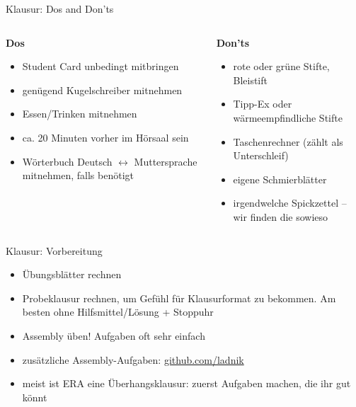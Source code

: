 \documentclass[
  german,            %
  aspectratio=169,    %
]{tumbeamer}
\newcommand{\cmark}{\ding{51}}%
\newcommand{\xmark}{\ding{55}}%
\begin{document}
\begin{frame}[c]{Klausur: Dos and Don'ts}{}
	\begin{columns}[c]
		\begin{column}{0.5\textwidth}
			\centering \textbf{Dos} \textcolor{green}{\cmark}
			\vspace{\baselineskip}
			\begin{itemize}
				\item Student Card unbedingt mitbringen
				\item genügend Kugelschreiber mitnehmen
				\item Essen/Trinken mitnehmen
				\item ca. 20 Minuten vorher im Hörsaal sein
				\item Wörterbuch Deutsch $\leftrightarrow$ Muttersprache mitnehmen, falls benötigt
			\end{itemize}
		\end{column}
		\begin{column}{0.5\textwidth}
			\centering \textbf{Don'ts} \textcolor{red}{\xmark}
			\vspace{\baselineskip}
			\begin{itemize}
				\item rote oder grüne Stifte, Bleistift
				\item Tipp-Ex oder wärmeempfindliche Stifte
				\item Taschenrechner (zählt als Unterschleif)
				\item eigene Schmierblätter
				\item irgendwelche Spickzettel -- wir finden die sowieso
			\end{itemize}
		\end{column}
	\end{columns}
\end{frame}

\begin{frame}[c]{Klausur: Vorbereitung}{}
	\begin{itemize}
		\item Übungsblätter rechnen
		\item Probeklausur rechnen, um Gefühl für Klausurformat zu bekommen. Am besten ohne Hilfsmittel/Lösung + Stoppuhr
		\item Assembly üben! Aufgaben oft sehr einfach
		\item zusätzliche Assembly-Aufgaben: \href{https://github.com/ladnik/RISC-V-Assembly-Introductory-Exercises}{github.com/ladnik}
		\item meist ist ERA eine Überhangsklausur: zuerst Aufgaben machen, die ihr gut könnt
	\end{itemize}
\end{frame}
\end{document}
